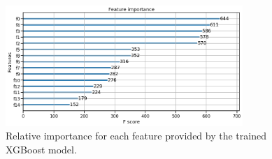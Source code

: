 \begin{figure}[!htbp]%
	\begin{adjustwidth}{}{}
		\centering
		\includegraphics[width=0.8\textwidth]{xgboost_feature_imp}
		\caption{Relative importance for each feature provided by the trained XGBoost model.}
		\label{fig:xgboost_feature_imp}
	\end{adjustwidth}
\end{figure}